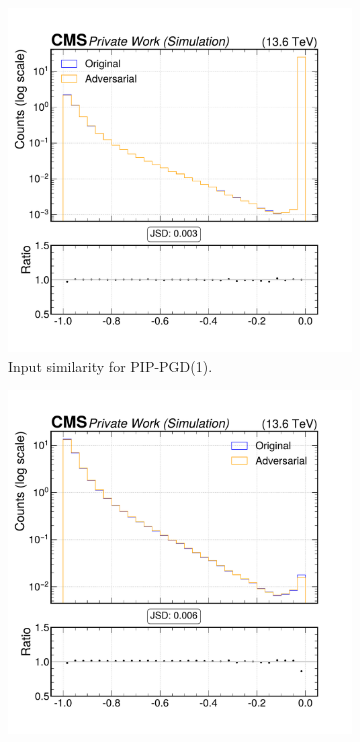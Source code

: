 \begin{figure}[htbp]
  \centering
  \begin{subfigure}[t]{0.32\textwidth}
    \includegraphics[width=\linewidth]{media/output/features/compare/combined_it_1/cmp_npf_arr_Npfcan_ptrel.pdf}
    \caption*{Input similarity for PIP-PGD(1).}
  \end{subfigure}\hfill
  \begin{subfigure}[t]{0.32\textwidth}
    \includegraphics[width=\linewidth]{media/output/features/compare/combined_it_2/cmp_npf_arr_Npfcan_ptrel.pdf}

\end{subfigure}
\end{figure}
